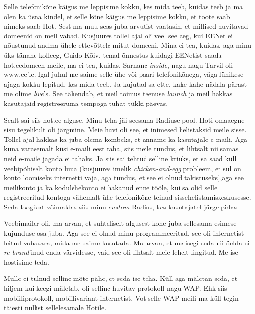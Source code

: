 Selle telefonikõne käigus me leppisime kokku, kes mida teeb, kuidas teeb ja ma olen ka üsna kindel, et selle kõne käigus me leppisime kokku, et toote saab nimeks saab Hot. Sest ma muu seas juba arvutist vaatasin, et millised huvitavad domeenid on meil vabad. Kusjuures tollel ajal oli veel see aeg, kui EENet  ei nõustunud andma ühele ettevõttele mitut domeeni. Mina ei tea, kuidas, aga minu üks tänane kolleeg, Guido Kõiv, temal õnnestus kuidagi EENetist saada hot.eedomeen meile, ma ei tea, kuidas. Sarnane \emph{inside}, nagu nagu Tarvil oli www.ee'le. Igal juhul me saime selle ühe või paari telefonikõnega, väga lühikese ajaga kokku lepitud, kes mida teeb. Ja kujutad sa ette, kahe  kahe nädala pärast me olime \emph{live}'s. See tähendab, et meil toimus teenuse \emph{launch} ja meil hakkas kasutajaid registreeruma tempoga tuhat tükki päevas.

Sealt sai siis hot.ee alguse. Minu teha jäi  seesama Radiuse pool. Hoti omaaegne sisu tegelikult oli järgmine. Meie huvi oli see, et inimesed helistaksid meile sisse.  Tollel ajal hakkas ka juba olema kombeks, et anname ka kasutajale e-maili. Aga kuna varasemalt küsi e-maili eest raha, siis meile tundus, et lihtsalt nii samas neid e-maile jagada ei tahaks. Ja siis sai tehtud  selline kriuks, et sa saad küll veebipõhiselt konto luua (kusjuures imelik \emph{chicken-and-egg} probleem, et sul on konto loomiseks internetti vaja, aga tundus, et see ei olnud takistuseks),aga see  meilikonto ja ka kodulehekonto ei hakanud enne tööle, kui sa olid selle registreeritud kontoga vähemalt ühe telefonikõne teinud sissehelistamiskeskusesse. Seda loogikat võimaldas siis minu \emph{custom} Radius, kes kasutajatel järge pidas. 


Veebimailer oli, ma arvan, et suhteliselt algusest kohe juba sellesama esimese kujunduse osa juba. Aga see ei olnud minu programmeeritud, see oli internetist leitud vabavara, mida me saime kasutada. Ma arvan, et me isegi seda nii-öelda ei \emph{re-brand}'inud enda värvidesse, vaid see oli lihtsalt meie lehelt lingitud. Me ise hostisime teda.


Mulle ei tulnud selline mõte pähe, et seda ise teha. Küll aga mäletan seda, et hiljem kui keegi mäletab, oli selline huvitav protokoll nagu WAP. Ehk siis mobiiliprotokoll, mobiilivariant internetist. Vot selle WAP-meili ma küll tegin täiesti nullist sellelesamale Hotile.

